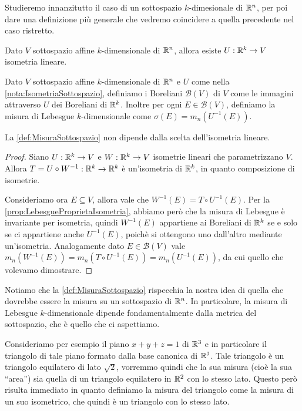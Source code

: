 Studieremo innanzitutto il caso di un sottospazio $k$-dimesionale di $\mathbb R^n$, per poi dare una definizione più generale che vedremo coincidere a quella precedente nel caso ristretto.

\begin{remark}\label{nota:IsometriaSottospazio}
	Dato $V$ sottospazio affine $k$-dimensionale di $\mathbb R^n$, allora esiste $U:\mathbb R^k\to V$ isometria lineare.
\end{remark}

\begin{definition}\label{def:MisuraSottospazio}
	Dato $V$ sottospazio affine $k$-dimensionale di $\mathbb R^n$ e $U$ come nella \cref{nota:IsometriaSottospazio}, definiamo i Boreliani $\mathcal{B}(V)$ di $V$ come le immagini attraverso $U$ dei Boreliani di $\mathbb R^k$. Inoltre per ogni $E\in\mathcal{B}(V)$, definiamo la misura di Lebesgue $k$-dimensionale come $\sigma(E)=m_n(U^{-1}(E))$.
\end{definition}

\begin{remark}
	La \cref{def:MisuraSottospazio} non dipende dalla scelta dell'isometria lineare.
\end{remark}
\begin{proof}
	Siano $U:\mathbb R^k\to V$ e $W:\mathbb R^k\to V$ isometrie lineari che parametrizzano $V$. Allora $T=U\circ W^{-1}:\mathbb R^k\to\mathbb R^k$ è un'isometria di $\mathbb R^k$, in quanto composizione di isometrie.
	
	Consideriamo ora $E\subseteq V$, allora vale che $W^{-1}(E)=T\circ U^{-1}(E)$. Per la \cref{prop:LebesgueProprietaIsometria}, abbiamo però che la misura di Lebesgue è invariante per isometria, quindi $W^{-1}(E)$ appartiene ai Boreliani di $\mathbb R^k$ se e solo se ci appartiene anche $U^{-1}(E)$, poichè si ottengono uno dall'altro mediante un'isometria. Analogamente dato $E\in\mathcal{B}(V)$ vale $m_n(W^{-1}(E))=m_n(T\circ U^{-1}(E))=m_n(U^{-1}(E))$, da cui quello che volevamo dimostrare.
\end{proof}

Notiamo che la \cref{def:MisuraSottospazio} rispecchia la nostra idea di quella che dovrebbe essere la misura su un sottospazio di $\mathbb R^n$. In particolare, la misura di Lebesgue $k$-dimensionale dipende fondamentalmente dalla metrica del sottospazio, che è quello che ci aspettiamo.

Consideriamo per esempio il piano $x+y+z=1$ di $\mathbb R^3$ e in particolare il triangolo di tale piano formato dalla base canonica di $\mathbb R^3$. Tale triangolo è un triangolo equilatero di lato $\sqrt{2}$, vorremmo quindi che la sua misura (cioè la sua ``area'') sia quella di un triangolo equilatero in $\mathbb R^2$ con lo stesso lato. Questo però risulta immediato in quanto definiamo la misura del triangolo come la misura di un suo isometrico, che quindi è un triangolo con lo stesso lato.


